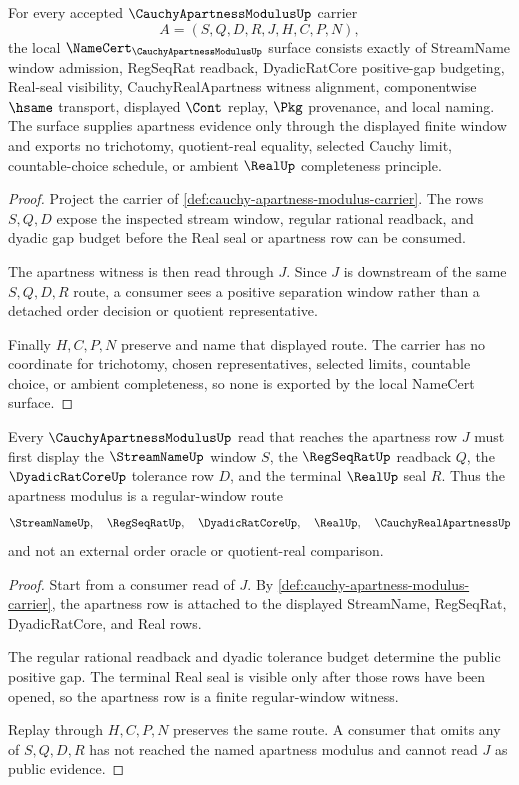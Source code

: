 \begin{theorem}
\label{thm:cauchy-apartness-modulus-namecert-obligations}
For every accepted $\CauchyApartnessModulusUp$ carrier
$$
A=(S,Q,D,R,J,H,C,P,N),
$$
the local $\NameCert_{\CauchyApartnessModulusUp}$ surface consists exactly of StreamName window admission, RegSeqRat readback, DyadicRatCore positive-gap budgeting, Real-seal visibility, CauchyRealApartness witness alignment, componentwise $\hsame$ transport, displayed $\Cont$ replay, $\Pkg$ provenance, and local naming. The surface supplies apartness evidence only through the displayed finite window and exports no trichotomy, quotient-real equality, selected Cauchy limit, countable-choice schedule, or ambient $\RealUp$ completeness principle.
\end{theorem}
\begin{proof}
Project the carrier of \autoref{def:cauchy-apartness-modulus-carrier}. The rows $S,Q,D$ expose the inspected stream window, regular rational readback, and dyadic gap budget before the Real seal or apartness row can be consumed.

The apartness witness is then read through $J$. Since $J$ is downstream of the same $S,Q,D,R$ route, a consumer sees a positive separation window rather than a detached order decision or quotient representative.

Finally $H,C,P,N$ preserve and name that displayed route. The carrier has no coordinate for trichotomy, chosen representatives, selected limits, countable choice, or ambient completeness, so none is exported by the local NameCert surface.
\end{proof}

\begin{theorem}
\label{thm:cauchy-apartness-modulus-regular-window}
Every $\CauchyApartnessModulusUp$ read that reaches the apartness row $J$ must first display the $\StreamNameUp$ window $S$, the $\RegSeqRatUp$ readback $Q$, the $\DyadicRatCoreUp$ tolerance row $D$, and the terminal $\RealUp$ seal $R$. Thus the apartness modulus is a regular-window route
$$
\StreamNameUp,\quad
\RegSeqRatUp,\quad
\DyadicRatCoreUp,\quad
\RealUp,\quad
\CauchyRealApartnessUp
$$
and not an external order oracle or quotient-real comparison.
\end{theorem}
\begin{proof}
Start from a consumer read of $J$. By \autoref{def:cauchy-apartness-modulus-carrier}, the apartness row is attached to the displayed StreamName, RegSeqRat, DyadicRatCore, and Real rows.

The regular rational readback and dyadic tolerance budget determine the public positive gap. The terminal Real seal is visible only after those rows have been opened, so the apartness row is a finite regular-window witness.

Replay through $H,C,P,N$ preserves the same route. A consumer that omits any of $S,Q,D,R$ has not reached the named apartness modulus and cannot read $J$ as public evidence.
\end{proof}

